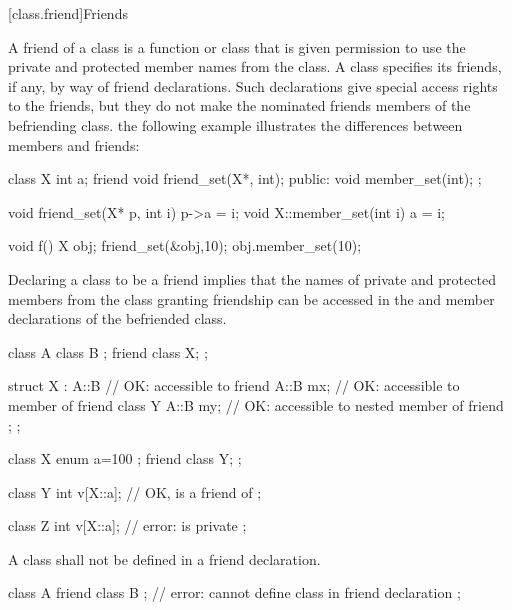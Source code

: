 [class.friend]{Friends}%
%

\pnum
A friend of a class is a function or class that is
given permission to use the private and protected member names from the class.
A class specifies its friends, if any, by way of friend declarations.
Such declarations give special access rights to the friends, but they
do not make the nominated friends members of the befriending class.
\enterexample
the following example illustrates the differences between
members and friends:
%
%
%

\begin{codeblock}
class X {
  int a;
  friend void friend_set(X*, int);
public:
  void member_set(int);
};

void friend_set(X* p, int i) { p->a = i; }
void X::member_set(int i) { a = i; }

void f() {
  X obj;
  friend_set(&obj,10);
  obj.member_set(10);
}
\end{codeblock}
\exitexample

\pnum
{}%
Declaring a class to be a friend implies that the names of private and
protected members from the class granting friendship can be accessed in the
 and member declarations of the befriended
class. \enterexample

\begin{codeblock}
class A {
  class B { };
  friend class X;
};

struct X : A::B {   // OK:  accessible to friend
  A::B mx;          // OK:  accessible to member of friend
  class Y {
    A::B my;        // OK:  accessible to nested member of friend
  };
};
\end{codeblock}
\exitexample
\enterexample

\begin{codeblock}
class X {
  enum { a=100 };
  friend class Y;
};

class Y {
  int v[X::a];      // OK,  is a friend of 
};

class Z {
  int v[X::a];      // error:  is private
};
\end{codeblock}
\exitexample

A class shall not be defined in a friend declaration. \enterexample
\begin{codeblock}
class A {
  friend class B { }; // error: cannot define class in friend declaration
};
\end{codeblock}
\exitexample

